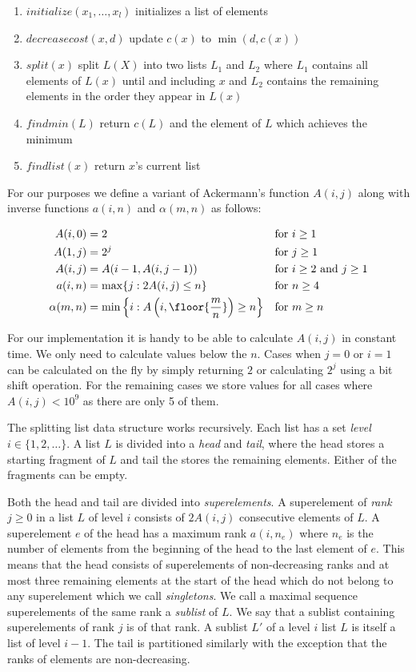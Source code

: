 \begin{enumerate}
    \item $initialize(x_1, \dots, x_l)$ initializes a list of elements
    \item $decreasecost(x, d)$ update $c(x)$ to $\min(d, c(x))$
    \item $split(x)$ split $L(X)$ into two lists $L_1$ and $L_2$ where $L_1$ contains all elements of $L(x)$ until and including $x$ and $L_2$ contains the remaining elements in the order they appear in $L(x)$
    \item $findmin(L)$ return $c(L)$ and the element of $L$ which achieves the minimum
    \item $findlist(x)$ return $x$'s current list
\end{enumerate}

For our purposes we define a variant of Ackermann's function $A(i,j)$ along with inverse functions $a(i,n)$ and $\alpha(m, n)$ as follows:

\begin{align*}
    A(i,0) &= 2 &&\text{for $i \geq 1$} \\
    A(1,j) &= 2^j &&\text{for $j \geq 1$} \\
    A(i,j) &= A(i-1,A(i, j-1)) &&\text{for $i \geq 2$ and $j \geq 1$} \\
    a(i,n) &= \max \{ j: 2A(i,j) \leq n \} &&\text{for $n \geq 4$} \\
    \alpha(m,n) &= \min \left\{ i: A\left(i,\floor{\frac{m}{n}}\right) \geq n \right\} &&\text{for $m \geq n$}
\end{align*}

For our implementation it is handy to be able to calculate $A(i,j)$ in constant time. We only need to calculate values below the $n$. Cases when $j = 0$ or $i = 1$ can be calculated on the fly by simply returning $2$ or calculating $2^j$ using a bit shift operation. For the remaining cases we store values for all cases where $A(i,j) < 10^9$ as there are only 5 of them.

The splitting list data structure works recursively. Each list has a set \textit{level} $i \in \{1, 2, \dots \}$. A list $L$ is divided into a \textit{head} and \textit{tail}, where the head stores a starting fragment of $L$ and tail the stores the remaining elements. Either of the fragments can be empty. 

Both the head and tail are divided into \textit{superelements}. A superelement of \textit{rank} $j \geq 0$ in a list $L$ of level $i$ consists of $2A(i,j)$ consecutive elements of $L$. A superelement $e$ of the head has a maximum rank $a(i, n_e)$ where $n_e$ is the number of elements from the beginning of the head to the last element of $e$. This means that the head consists of superelements of non-decreasing ranks and at most three remaining elements at the start of the head which do not belong to any superelement which we call \textit{singletons}. We call a maximal sequence superelements of the same rank a \textit{sublist} of $L$. We say that a sublist containing superelements of rank $j$ is of that rank. A sublist $L'$ of a level $i$ list $L$ is itself a list of level $i-1$. The tail is partitioned similarly with the exception that the ranks of elements are non-decreasing. 

